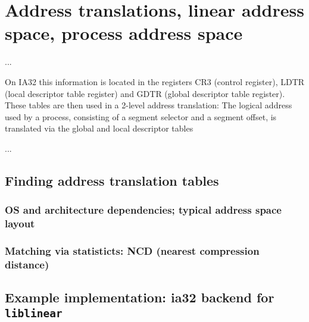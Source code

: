 %
%

\section{Address translations, linear address space, process address space}
\label{address_translation}

...

On IA32 this information is located in the registers CR3 (control register),
LDTR (local descriptor table register) and GDTR (global descriptor table
register). These tables are then used in a 2-level address translation: The
logical address used by a process, consisting of a segment selector and a
segment offset, is translated via the global and local descriptor tables

...



\subsection{Finding address translation tables}
\label{findingATT}

\subsubsection{OS and architecture dependencies; typical address space layout}

\subsubsection{Matching via statisticts: NCD (nearest compression distance)}



\subsection{Example implementation: ia32 backend for \texttt{liblinear}}



